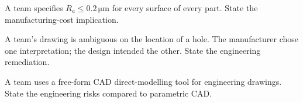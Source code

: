 \begin{exercise}
A team specifies $R_a \leq 0.2\,\si{\micro\meter}$ for every surface of every part. State the manufacturing-cost implication.
\end{exercise}

\begin{exercise}
A team's drawing is ambiguous on the location of a hole. The manufacturer chose one interpretation; the design intended the other. State the engineering remediation.
\end{exercise}

\begin{exercise}
A team uses a free-form CAD direct-modelling tool for engineering drawings. State the engineering risks compared to parametric CAD.
\end{exercise}
